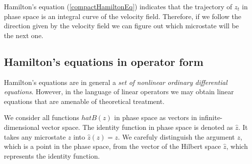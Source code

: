 \documentclass[b5paper,openright,10pt]{book}
\begin{document}
Hamilton's equation (\ref{compactHamiltonEq}) indicates that the trajectory of $z_t$ in phase space is an integral curve of the velocity field. Therefore, if we follow the direction given by the velocity field we can figure out which microstate will be the next one. 


\subsection{Hamilton's equations in operator form}
Hamilton's equations are in general a {\it set of nonlinear ordinary differential equations}. However, in the language of linear operators we may obtain linear equations that are amenable of theoretical treatment. 

We consider all functions $hat{B}(z)$ in phase space as vectors in infinite-dimensional vector space. 
The identity function in phase space is denoted as $\hat{z}$. It takes any microstate $z$ into $\hat{z}(z)=z$. 
We carefuly distinguish the argument $z$, which is a point in the phase space, from the vector of the Hilbert space $\hat{z}$, which represents the identity function.
\end{document}

